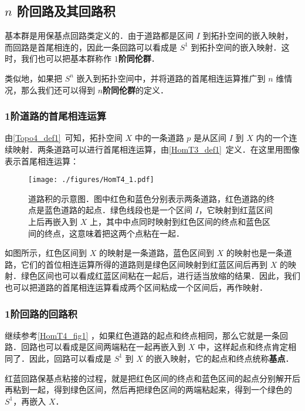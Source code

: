 \subsection{$n$ 阶回路及其回路积}

基本群是用保基点回路类定义的．由于道路都是区间 $I$ 到拓扑空间的嵌入映射，而回路是首尾相连的，因此一条回路可以看成是 $S^1$ 到拓扑空间的嵌入映射．这时，我们也可以把基本群称作 $1$\textbf{阶同伦群}．

类似地，如果把 $S^n$ 嵌入到拓扑空间中，并将道路的首尾相连运算推广到 $n$ 维情况，那么我们还可以得到 $n$\textbf{阶同伦群}的定义．

\subsubsection{1阶道路的首尾相连运算}

由\autoref{Topo4_def1}~可知，拓扑空间 $X$ 中的一条道路 $p$ 是从区间 $I$ 到 $X$ 内的一个连续映射．两条道路可以进行首尾相连运算，由\autoref{HomT3_def1}~定义．在这里用图像表示首尾相连运算：


\begin{figure}[ht]
\centering
\texttt{[image: ./figures/HomT4\_1.pdf]}
\caption{道路积的示意图．图中红色和蓝色分别表示两条道路，红色道路的终点是蓝色道路的起点．绿色线段也是一个区间 $I$，它映射到红蓝区间上后再嵌入到 $X$ 上，其中中点同时映射到红色区间的终点和蓝色区间的终点，这意味着把这两个点粘在一起．} \label{HomT4_fig1}
\end{figure}

如图所示，红色区间到 $X$ 的映射是一条道路，蓝色区间到 $X$ 的映射也是一条道路，它们的首位相连运算所得的道路则是绿色区间映射到红蓝区间后再到 $X$ 的映射．绿色区间也可以看成红蓝区间粘在一起后，进行适当放缩的结果．因此，我们也可以把道路的首尾相连运算看成两个区间粘成一个区间后，再作映射．

\subsubsection{1阶回路的回路积}

继续参考\autoref{HomT4_fig1} ，如果红色道路的起点和终点相同，那么它就是一条回路．回路也可以看成是区间两端粘在一起再嵌入到 $X$ 中，这样起点和终点肯定相同了．因此，回路可以看成是 $S^1$ 到 $X$ 的嵌入映射，它的起点和终点统称\textbf{基点}．

红蓝回路保基点粘接的过程，就是把红色区间的终点和蓝色区间的起点分别解开后再粘到一起，得到绿色区间，然后再把绿色区间的两端粘起来，得到一个绿色的 $S^1$，再嵌入 $X$．

